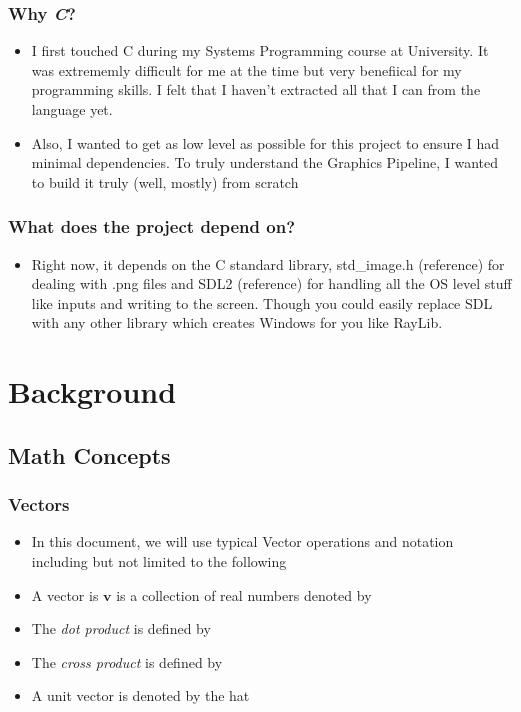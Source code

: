 \documentclass{article}
\begin{document}
\subsubsection{Why \textit{C}?}
\begin{itemize}
\item I first touched C during my Systems Programming course at University. It was extrememly difficult for me at the time but very benefiical for my programming skills. I felt that I haven't extracted all that I can from the language yet.
\item Also, I wanted to get as low level as possible for this project to ensure I had minimal dependencies. To truly understand the Graphics Pipeline, I wanted to build it truly (well, mostly) from scratch
\end{itemize}
\subsubsection{What does the project depend on?}
\begin{itemize}
\item Right now, it depends on the C standard library, std\_image.h (reference) for dealing with .png files and SDL2 (reference) for handling all the OS level stuff like inputs and writing to the screen. Though you could easily replace SDL with any other library which creates Windows for you like RayLib.
\end{itemize}

\section{Background}

\subsection{Math Concepts}
\subsubsection{Vectors}
\begin{itemize}
\item In this document, we will use typical Vector operations and notation including but not limited to the following
\item A vector is $\textbf{v}$ is a collection of real numbers denoted by 
\item The \textit{dot product} is defined by
\item The \textit{cross product} is defined by
\item A unit vector is denoted by the hat
\end{itemize}
\end{document}
